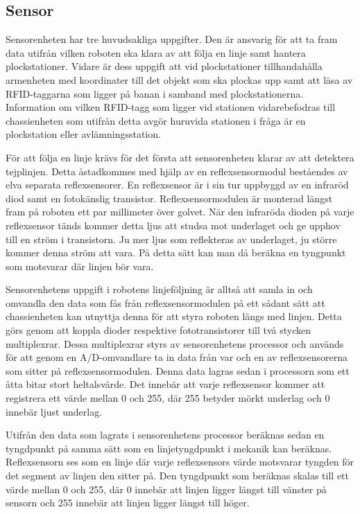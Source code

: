 

\subsection{Sensor}

Sensorenheten har tre huvudsakliga uppgifter. Den är ansvarig för att ta fram data utifrån vilken roboten ska klara av att följa en linje samt hantera plockstationer. Vidare är dess uppgift att vid plockstationer tillhandahålla armenheten med koordinater till det objekt som ska plockas upp samt att läsa av RFID-taggarna som ligger på banan i samband med plockstationerna. Information om vilken RFID-tagg som ligger vid stationen vidarebefodras till chassienheten som utifrån detta avgör huruvida stationen i fråga är en plockstation eller avlämningsstation.

För att följa en linje krävs för det första att sensorenheten klarar av att detektera tejplinjen. Detta åstadkommes med hjälp av en reflexsensormodul beståendes av elva separata reflexsensorer. En reflexsensor är i sin tur uppbyggd av en infraröd diod samt en fotokänslig transistor. Reflexsensormodulen är monterad längst fram på roboten ett par millimeter över golvet. När den infraröda dioden på varje reflexsensor tänds kommer detta ljus att studsa mot underlaget och ge upphov till en ström i transistorn. Ju mer ljus som reflekteras av underlaget, ju större kommer denna ström att vara. På detta sätt kan man då beräkna en tyngpunkt som motsvarar där linjen bör vara.

Sensorenhetens uppgift i robotens linjeföljning är alltså att samla in och omvandla den data som fås från reflexsensormodulen på ett sådant sätt att chassienheten kan utnyttja denna för att styra roboten längs med linjen. Detta görs genom att koppla dioder respektive fototransistorer till två stycken multiplexrar. Dessa multiplexrar styrs av sensorenhetens processor och används för att genom en A/D-omvandlare ta in data från var och en av reflexsensorerna som sitter på reflexsensormodulen. Denna data lagras sedan i processorn som ett åtta bitar stort heltalsvärde. Det innebär att varje reflexsensor kommer att registrera ett värde mellan 0 och 255, där 255 betyder mörkt underlag och 0 innebär ljust underlag.

Utifrån den data som lagrats i sensorenhetens processor beräknas sedan en tyngdpunkt på samma sätt som en linjetyngdpunkt i mekanik kan beräknas. Reflexsensorn ses som en linje där varje reflexsensors värde motsvarar tyngden för det segment av linjen den sitter på. Den tyngdpunkt som beräknas skalas till ett värde mellan 0 och 255, där 0 innebär att linjen ligger längst till vänster på sensorn och 255 innebär att linjen ligger längst till höger. 


